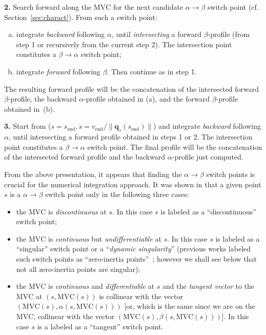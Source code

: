 \documentclass[9pt,technote]{IEEEtran}
\newcommand{\bfq}{\mathbf{q}}
\newcommand{\fin}{\mathrm{end}}
\newcommand{\MVC}{\mathrm{MVC}}
\begin{document}
\noindent\textbf{2.} Search forward along the $\MVC$ for the next candidate
  $\alpha\to\beta$ switch point (cf. Section~\ref{sec:charact}). From
  such a switch point:
  \begin{enumerate}[(a)]
  \item integrate \emph{backward} following $\alpha$, until
    \emph{intersecting} a forward $\beta$-profile (from step 1 or
    recursively from the current step 2). The intersection point
    constitutes a $\beta\to\alpha$ switch point;
  \item integrate \emph{forward} following $\beta$. Then continue as
    in step 1.
\end{enumerate}
The resulting forward profile will be the concatenation of the
intersected forward $\beta$-profile, the backward $\alpha$-profile
obtained in (a), and the forward $\beta$-profile obtained in~(b).

\noindent\textbf{3.} Start from ($s=s_\fin,\dot s=v_\fin/\|\bfq_s(s_\fin)\|$)
  and integrate \emph{backward} following $\alpha$, until intersecting
  a forward profile obtained in steps 1 or 2.  The intersection point
  constitutes a $\beta\to\alpha$ switch point. The final profile will
  be the concatenation of the intersected forward profile and the
  backward $\alpha$-profile just computed.

  From the above presentation, it appears that finding the
  $\alpha\to\beta$ switch points is crucial for the numerical
  integration approach. It was shown in
  \cite{PJ87jra,SY89tra,SL92jdsmc} that a given point $s$ is a
  $\alpha\to\beta$ switch point only in the following three cases:
\begin{itemize}
\item the $\MVC$ is \emph{discontinuous} at $s$. In this case $s$ is
  labeled as a ``discontinuous'' switch point;
\item the $\MVC$ is \emph{continuous} but \emph{undifferentiable} at
  $s$. In this case $s$ is labeled as a ``singular'' switch point or a
  ``\emph{dynamic singularity}'' (previous works labeled such switch
  points as ``zero-inertia points''~\cite{SY89tra}; however we shall
  see below that not all zero-inertia points are singular);
\item the $\MVC$ is \emph{continuous} and \emph{differentiable} at $s$
  and the \emph{tangent vector} to the $\MVC$ at $(s,\MVC(s))$ is
  collinear with the vector $(\MVC(s),\alpha(s,\MVC(s)))$ [or, which
  is the same since we are on the $\MVC$, collinear with the vector
  $(\MVC(s),\beta(s,\MVC(s)))$]. In this case $s$ is a labeled as a
  ``tangent'' switch point.
\end{itemize}
\end{document}
